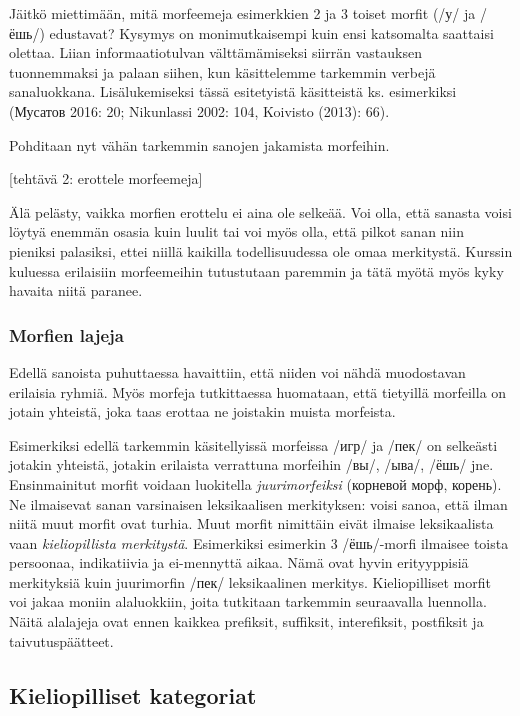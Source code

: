 \documentclass[]{scrartcl}
\begin{document}
Jäitkö miettimään, mitä morfeemeja esimerkkien 2 ja 3 toiset morfit (/у/
ja /ёшь/) edustavat? Kysymys on monimutkaisempi kuin ensi katsomalta
saattaisi olettaa. Liian informaatiotulvan välttämämiseksi siirrän
vastauksen tuonnemmaksi ja palaan siihen, kun käsittelemme tarkemmin
verbejä sanaluokkana. Lisälukemiseksi tässä esitetyistä käsitteistä ks.
esimerkiksi (Мусатов 2016: 20; Nikunlassi 2002: 104, Koivisto (2013):
66).

Pohditaan nyt vähän tarkemmin sanojen jakamista morfeihin.

{[}tehtävä 2: erottele morfeemeja{]}

Älä pelästy, vaikka morfien erottelu ei aina ole selkeää. Voi olla, että
sanasta voisi löytyä enemmän osasia kuin luulit tai voi myös olla, että
pilkot sanan niin pieniksi palasiksi, ettei niillä kaikilla
todellisuudessa ole omaa merkitystä. Kurssin kuluessa erilaisiin
morfeemeihin tutustutaan paremmin ja tätä myötä myös kyky havaita niitä
paranee.

\subsubsection{Morfien lajeja}\label{morfien-lajeja}

Edellä sanoista puhuttaessa havaittiin, että niiden voi nähdä
muodostavan erilaisia ryhmiä. Myös morfeja tutkittaessa huomataan, että
tietyillä morfeilla on jotain yhteistä, joka taas erottaa ne joistakin
muista morfeista.

Esimerkiksi edellä tarkemmin käsitellyissä morfeissa /игр/ ja /пек/ on
selkeästi jotakin yhteistä, jotakin erilaista verrattuna morfeihin /вы/,
/ыва/, /ёшь/ jne. Ensinmainitut morfit voidaan luokitella
\emph{juurimorfeiksi} (корневой морф, корень). Ne ilmaisevat sanan
varsinaisen leksikaalisen merkityksen: voisi sanoa, että ilman niitä
muut morfit ovat turhia. Muut morfit nimittäin eivät ilmaise
leksikaalista vaan \emph{kieliopillista merkitystä}. Esimerkiksi
esimerkin 3 /ёшь/-morfi ilmaisee toista persoonaa, indikatiivia ja
ei-mennyttä aikaa. Nämä ovat hyvin erityyppisiä merkityksiä kuin
juurimorfin /пек/ leksikaalinen merkitys. Kieliopilliset morfit voi
jakaa moniin alaluokkiin, joita tutkitaan tarkemmin seuraavalla
luennolla. Näitä alalajeja ovat ennen kaikkea prefiksit, suffiksit,
interefiksit, postfiksit ja taivutuspäätteet.

\subsection{Kieliopilliset kategoriat}\label{kieliopilliset-kategoriat}
\end{document}
